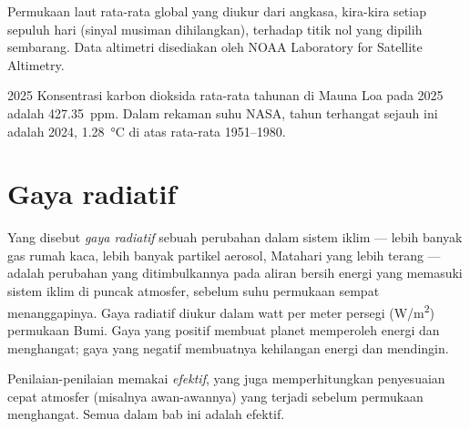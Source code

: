 \begin{omfigure}

{\small Permukaan laut rata-rata global yang diukur dari angkasa, kira-kira
setiap sepuluh hari (sinyal musiman dihilangkan), terhadap titik nol yang
dipilih sembarang. Data altimetri disediakan oleh NOAA Laboratory for Satellite
Altimetry.}
\end{omfigure}

\begin{dated}{2025}
Konsentrasi karbon dioksida rata-rata tahunan di Mauna Loa pada 2025 adalah
\qty{427.35}{ppm}. Dalam rekaman suhu NASA, tahun terhangat sejauh ini adalah
2024, \qty{1.28}{\degreeCelsius} di atas rata-rata 1951--1980.
\end{dated}

\section{Gaya radiatif}

\begin{definition}\label{def:g12:climate-change:forcing}
Yang disebut \emph{gaya radiatif} sebuah perubahan dalam
sistem iklim --- lebih banyak gas rumah kaca, lebih banyak partikel aerosol,
Matahari yang lebih terang --- adalah perubahan yang ditimbulkannya pada aliran
bersih energi yang memasuki sistem iklim di puncak atmosfer, sebelum suhu
permukaan sempat menanggapinya. Gaya radiatif diukur dalam watt per meter
persegi (\unit{W/m^2}) permukaan Bumi. Gaya yang positif membuat planet
memperoleh energi dan menghangat; gaya yang negatif membuatnya kehilangan
energi dan mendingin.
\end{definition}

\begin{remark}\label{rem:g12:climate-change:effective}
Penilaian-penilaian memakai  \emph{efektif}, yang juga
memperhitungkan penyesuaian cepat atmosfer (misalnya awan-awannya) yang terjadi
sebelum permukaan menghangat. Semua  dalam bab ini adalah  efektif.
\end{remark}

